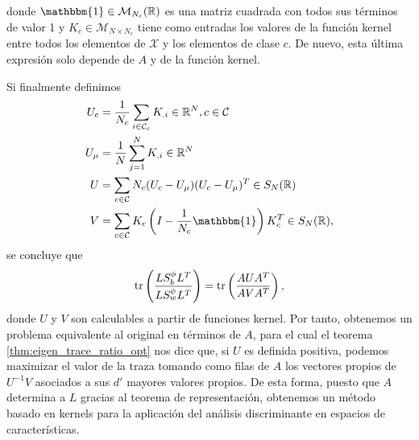 \documentclass{book}
\begin{document}
donde $\mathbbm{1} \in \mathcal{M}_{N_c}(\R)$ es una matriz cuadrada con todos sus términos de valor 1 y $K_c \in \mathcal{M}_{N\times N_c}$ tiene como entradas los valores de la función kernel entre todos los elementos de $\mathcal{X}$ y los elementos de clase $c$. De nuevo, esta última expresión solo depende de $A$ y de la función kernel.

Si finalmente definimos
\begin{equation*}
	\begin{split}
		U_c &= \frac{1}{N_c}\sum_{i \in \mathcal{C}_c}K_{.i} \in \R^N, c \in \mathcal{C}\\
		U_{\mu} &= \frac{1}{N}\sum_{j=1}^N K_{.i} \in \R^N \\
		U &= \sum_{c \in \mathcal{C}} N_c(U_c - U_{\mu})(U_c - U_{\mu})^T \in S_N(\R) \\
		V &= \sum_{c \in \mathcal{C}} K_c\left(I - \frac{1}{N_c}\mathbbm{1}\right)K_c^T \in S_N(\R),
	\end{split}
\end{equation*}
se concluye que
\begin{equation*}
	\operatorname{tr}\left(\frac{L S_b^{\phi} L^T}{LS_w^{\phi}L^T}\right) = \operatorname{tr}\left(\frac{AUA^T}{AVA^T} \right),
\end{equation*}
donde $U$ y $V$ son calculables a partir de funciones kernel. Por tanto, obtenemos un problema equivalente al original en términos de $A$, para el cual el teorema \ref{thm:eigen_trace_ratio_opt} nos dice que, si $U$ es definida positiva, podemos maximizar el valor de la traza tomando como filas de $A$ los vectores propios de $U^{-1}V$ asociados a sus $d'$ mayores valores propios. De esta forma, puesto que $A$ determina a $L$ gracias al teorema de representación, obtenemos un método basado en kernels para la aplicación del análisis discriminante en espacios de características.


\printbibliography
\nocite{*}
\end{document}
